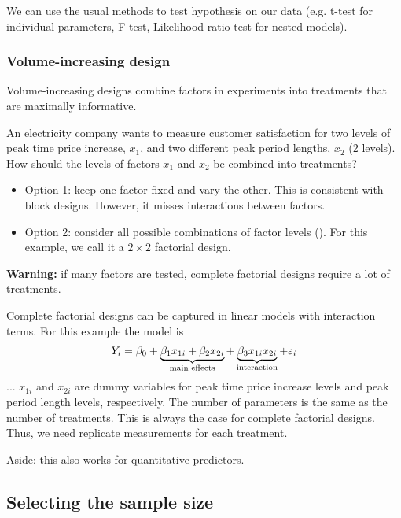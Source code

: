 We can use the usual methods to test hypothesis on our data (e.g. t-test for individual parameters, F-test, Likelihood-ratio test for nested models).

\subsubsection{Volume-increasing design}

Volume-increasing designs combine factors in experiments into treatments that are maximally informative.

\begin{example}
	An electricity company wants to measure customer satisfaction for two levels of peak time price increase, $x_1$, and two different peak period lengths, $x_2$ (2 levels). How should the levels of factors $x_1$ and $x_2$ be combined into treatments?
	\begin{itemize}
		\item Option 1: keep one factor fixed and vary the other. This is consistent with block designs. However, it misses interactions between factors.
		\item Option 2: consider all possible combinations of factor levels (). For this example, we call it a $2\times 2$ factorial design.
	\end{itemize}
\end{example}

\textbf{Warning:} if many factors are tested, complete factorial designs require a lot of treatments.

Complete factorial designs can be captured in linear models with interaction terms. For this example the model is
\begin{align}
	Y_i = \beta_0 + \underbrace{\beta_1x_{1i} + \beta_2x_{2i}}_{\text{main effects}} + \underbrace{\beta_3x_{1i}x_{2i}}_{\text{interaction}} + \epsilon_i \notag
\end{align}
... $x_{1i}$ and $x_{2i}$ are dummy variables for peak time price increase levels and peak period length levels, respectively. The number of parameters is the same as the number of treatments. This is always the case for complete factorial designs. Thus, we need replicate measurements for each treatment.

Aside: this also works for quantitative predictors.

\subsection{Selecting the sample size}

